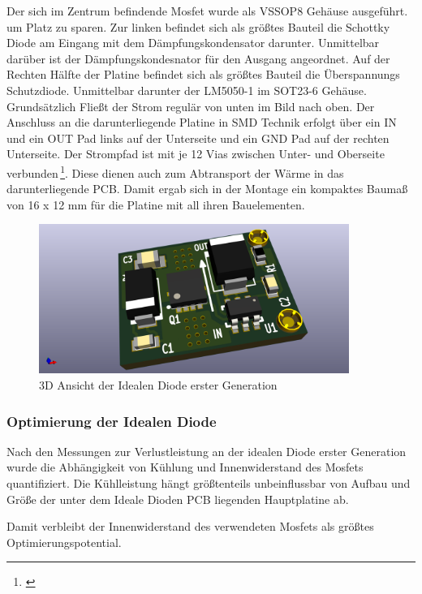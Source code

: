 Der sich im Zentrum befindende Mosfet wurde als VSSOP8 Gehäuse ausgeführt. um Platz zu sparen. Zur linken befindet sich als größtes Bauteil die Schottky Diode am Eingang mit dem Dämpfungskondensator darunter. Unmittelbar darüber ist der Dämpfungskondesnator für den Ausgang angeordnet. Auf der Rechten Hälfte der Platine befindet sich als größtes Bauteil die Überspannungs Schutzdiode. Unmittelbar darunter der LM5050-1 im SOT23-6 Gehäuse.
Grundsätzlich Fließt der Strom regulär von unten im Bild nach oben.
Der Anschluss an die darunterliegende Platine in SMD Technik erfolgt über ein IN und ein OUT Pad links auf der Unterseite und ein GND Pad auf der rechten Unterseite.
Der Strompfad ist mit je 12 Vias zwischen Unter- und Oberseite verbunden\,\footnote{\cite[vgl.][Seite~24f.]{PCBStandard}}. Diese dienen auch zum Abtransport der Wärme in das darunterliegende PCB.
Damit ergab sich in der Montage ein kompaktes Baumaß von 16 x 12 mm für die Platine mit all ihren Bauelementen.

\begin{figure}[H]
\centering
\includegraphics[width=0.9\textwidth]{bilder/Ideale_Diode/Ideale_Diode_Mini_rev01_ver00-3D.png} 
\caption{3D Ansicht der Idealen Diode erster Generation} 
\label{fig:3D Ansicht der Idealen Diode erster Generation}
\end{figure}

\subsubsection{Optimierung der Idealen Diode}

Nach den Messungen zur Verlustleistung an der idealen Diode erster Generation wurde die Abhängigkeit von Kühlung und Innenwiderstand des Mosfets quantifiziert. 
Die Kühlleistung hängt größtenteils unbeinflussbar \cite{IEEE_Thermal_conductivity} von Aufbau und Größe der unter dem Ideale Dioden PCB liegenden Hauptplatine ab.

Damit verbleibt der Innenwiderstand des verwendeten Mosfets als größtes Optimierungspotential.

